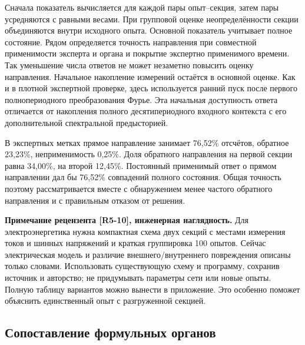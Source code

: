 Сначала показатель вычисляется для каждой пары опыт--секция,
затем пары усредняются с равными весами.
При групповой оценке неопределённости секции
объединяются внутри исходного опыта.
Основной показатель учитывает полное состояние.
Рядом определяется точность направления
при совместной применимости эксперта и органа
и покрытие экспертно применимого времени.
Так уменьшение числа ответов не может незаметно
повысить оценку направления.
Начальное накопление измерений остаётся в основной оценке.
Как и в плотной экспертной проверке,
здесь используется ранний пуск после первого
полнопериодного преобразования Фурье.
Эта начальная доступность ответа отличается
от накопления полного десятипериодного входного контекста
с его дополнительной спектральной предысторией.

В экспертных метках прямое направление занимает 76,52\%
отсчётов, обратное 23,23\%, неприменимость 0,25\%.
Доля обратного направления на первой секции равна 34,00\%,
на второй 12,45\%.
Постоянный применимый ответ о прямом направлении
дал бы 76,52\% совпадений полного состояния.
Общая точность поэтому рассматривается вместе
с обнаружением менее частого обратного направления
и с правильным отказом от решения.

\ifdefined\AuthorReview
\par\smallskip\begingroup\small\raggedright\color{red!60!black}
\noindent\textbf{Примечание рецензента [R5-10], инженерная наглядность.} Для электроэнергетика нужна компактная схема двух секций с местами измерения токов и шинных напряжений и краткая группировка 100 опытов. Сейчас электрическая модель и различие внешнего/внутреннего повреждения описаны только словами. Использовать существующую схему и программу, сохранив источник и авторство; не придумывать параметры сети или новые опыты. Полную таблицу вариантов можно вынести в приложение. Это особенно поможет объяснить единственный опыт с разгруженной секцией.\par\endgroup\smallskip
\fi
\ifdefined\AuthorReview
\par{}\smallskip
\fi

\subsection{Сопоставление формульных органов}


